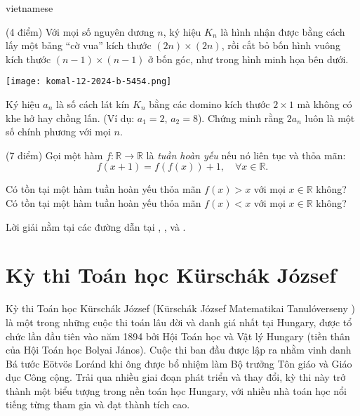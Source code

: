 \documentclass{article}
\begin{document}
\begin{otherlanguage*}{vietnamese}
\begin{problem*}
    (4 điểm) Với mọi số nguyên dương \( n \), ký hiệu \( K_n \) là hình nhận được bằng cách lấy một bảng ``cờ vua'' kích thước \( (2n) \times (2n) \),
    rồi cắt bỏ bốn hình vuông kích thước \( (n-1) \times (n-1) \) ở bốn góc, như trong hình minh họa bên dưới.
    \begin{center}
        \texttt{[image: komal-12-2024-b-5454.png]}
    \end{center}
    
    Ký hiệu \( a_n \) là số cách lát kín \( K_n \) bằng các domino kích thước \( 2 \times 1 \) mà không có khe hở hay chồng lấn. (Ví dụ: \( a_1 = 2 \), \( a_2 = 8 \)).  
    Chứng minh rằng \( 2a_n \) luôn là một số chính phương với mọi \( n \).
\end{problem*}

\begin{problem*}
    (7 điểm) Gọi một hàm \( f: \mathbb{R} \to \mathbb{R} \) là \textit{tuần hoàn yếu} nếu nó liên tục và thỏa mãn:
    \[
        f(x+1) = f(f(x)) + 1, \quad \forall x \in \mathbb{R}.
    \]
    
    \begin{enumerate}[topsep=0pt, partopsep=0pt, itemsep=0pt]
        \ii Có tồn tại một hàm tuần hoàn yếu thỏa mãn \( f(x) > x \) với mọi \( x \in \mathbb{R} \) không?  
        \ii Có tồn tại một hàm tuần hoàn yếu thỏa mãn \( f(x) < x \) với mọi \( x \in \mathbb{R} \) không?
    \end{enumerate}
\end{problem*}

\begin{remark*}
    Lời giải nằm tại các đường dẫn tại \cite{c_1833}, \cite{b_5424}, và \cite{a_895}.
\end{remark*}

\newpage

\section{Kỳ thi Toán học Kürschák József}

Kỳ thi Toán học Kürschák József (Kürschák József Matematikai Tanulóverseny \cite{Kurschak}) là một trong những cuộc thi toán lâu đời và danh giá nhất tại Hungary,
được tổ chức lần đầu tiên vào năm 1894 bởi Hội Toán học và Vật lý Hungary (tiền thân của Hội Toán học Bolyai János).
Cuộc thi ban đầu được lập ra nhằm vinh danh Bá tước Eötvös Loránd khi ông được bổ nhiệm làm Bộ trưởng Tôn giáo và Giáo dục Công cộng.
Trải qua nhiều giai đoạn phát triển và thay đổi, kỳ thi này trở thành một biểu tượng trong nền toán học Hungary, với nhiều nhà toán học nổi tiếng từng tham gia và đạt thành tích cao.


\end{otherlanguage*}
\end{document}
